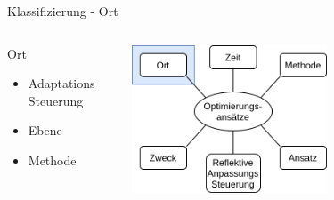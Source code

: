 \documentclass[de,16:9]{sdqbeamer}
\begin{document}
\begin{frame}{Klassifizierung - Ort}
	\begin{columns}
		 \begin{center}
			\begin{greenblock}{Ort}
				\begin{itemize}
					\item Adaptations Steuerung
					\item Ebene
					\item Methode
				\end{itemize}
			\end{greenblock}
		\end{center}
		 \begin{center}
			\includegraphics[width=0.6\textwidth]{sources/ClassificationProposal-Proposal_DE_Location.png}
		\end{center}
	\end{columns}
\end{frame}
\end{document}
